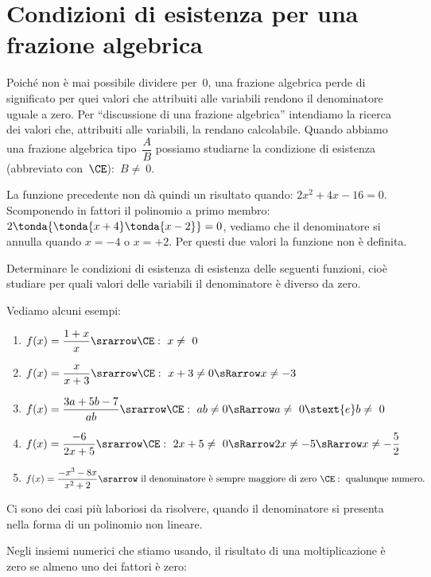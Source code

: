 \section{Condizioni di esistenza per una frazione algebrica}
\label{sec:frazalg_condizioniesistenza}

Poiché non è mai possibile dividere per~\(0\), una frazione algebrica perde 
di significato per quei valori che attribuiti alle variabili rendono il 
denominatore uguale a zero. 
Per ``discussione di una frazione algebrica'' intendiamo la ricerca dei 
valori che, attribuiti alle variabili, la rendano calcolabile. 
Quando abbiamo una frazione algebrica tipo~\(\dfrac{A}{B}\) possiamo 
studiarne la condizione di esistenza (abbreviato con~\(\CE\)):~\(B\neq~0\).

La funzione precedente non dà quindi un risultato quando: \(2x^2 +4x -16=0\).
Scomponendo in fattori il polinomio a primo membro: 
\(2 \tonda{\tonda{x+4}\tonda{x-2}}=0\),
vediamo che il denominatore si annulla quando \(x=-4\) o \(x=+2\).
Per questi due valori la funzione non è definita.
 \begin{esempio}
Determinare le condizioni di esistenza di esistenza delle seguenti funzioni, 
cioè studiare per quali valori delle variabili il denominatore è diverso da 
zero.

Vediamo alcuni esempi:

\begin{enumerate}
\item \(f(x)=\dfrac{1+x}{x} \srarrow \CE:~ x\neq~0\)
\item \(f(x)=\dfrac{x}{x+3} \srarrow \CE:~ x+3 \neq 0 \sRarrow x \neq -3\)
\item \(f(x)=\dfrac{3a+5b-7}{ab} \srarrow 
\CE:~ ab \neq 0 \sRarrow a\neq~0 \stext{e} b\neq~0\)
\item \(f(x)=\dfrac{-6}{2x+5} \srarrow 
\CE:~ 2x+5\neq~0 \sRarrow 2x \neq -5 \sRarrow x\neq -\dfrac{5}{2}\)
\item \(f(x)=\dfrac{-x^{3}-8x}{x^{2}+2} \srarrow 
\text{ il denominatore è sempre maggiore di zero } \CE:~\text{qualunque 
numero.} \)
\end{enumerate}
\end{esempio}

Ci sono dei casi più laboriosi da risolvere, quando il denominatore si 
presenta nella forma di un polinomio non lineare.

Negli insiemi numerici che stiamo usando, il risultato di una moltiplicazione 
è zero se almeno uno dei fattori è zero:

